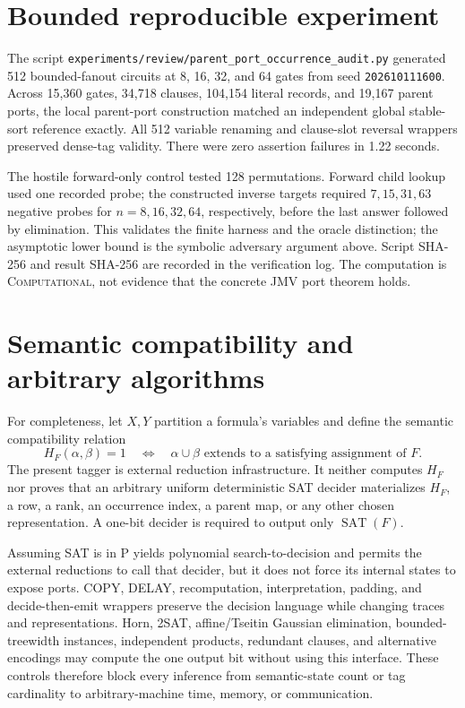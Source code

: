 \documentclass[11pt]{article}
\newcommand{\status}[1]{\textsc{#1}}
\begin{document}
\section{Bounded reproducible experiment}

The script
\texttt{experiments/review/parent\_port\_occurrence\_audit.py} generated 512
bounded-fanout circuits at 8, 16, 32, and 64 gates from seed
\texttt{202610111600}.  Across 15,360 gates, 34,718 clauses, 104,154 literal
records, and 19,167 parent ports, the local parent-port construction matched
an independent global stable-sort reference exactly.  All 512 variable
renaming and clause-slot reversal wrappers preserved dense-tag validity.
There were zero assertion failures in 1.22 seconds.

The hostile forward-only control tested 128 permutations.  Forward child
lookup used one recorded probe; the constructed inverse targets required
$7,15,31,63$ negative probes for $n=8,16,32,64$, respectively, before the
last answer followed by elimination.  This validates the finite harness and
the oracle distinction; the asymptotic lower bound is the symbolic adversary
argument above.  Script SHA-256 and result SHA-256 are recorded in the
verification log.  The computation is \status{Computational}, not evidence
that the concrete JMV port theorem holds.

\section{Semantic compatibility and arbitrary algorithms}

For completeness, let $X,Y$ partition a formula's variables and define the
semantic compatibility relation
\[
 H_F(\alpha,\beta)=1
 \quad\Longleftrightarrow\quad
 \alpha\cup\beta\text{ extends to a satisfying assignment of }F.
\]
The present tagger is external reduction infrastructure.  It neither
computes $H_F$ nor proves that an arbitrary uniform deterministic SAT decider
materializes $H_F$, a row, a rank, an occurrence index, a parent map, or any
other chosen representation.  A one-bit decider is required to output only
$\operatorname{SAT}(F)$.

Assuming SAT is in P yields polynomial search-to-decision and permits the
external reductions to call that decider, but it does not force its internal
states to expose ports.  COPY, DELAY, recomputation, interpretation, padding,
and decide-then-emit wrappers preserve the decision language while changing
traces and representations.  Horn, 2SAT, affine/Tseitin Gaussian
elimination, bounded-treewidth instances, independent products, redundant
clauses, and alternative encodings may compute the one output bit without
using this interface.  These controls therefore block every inference from
semantic-state count or tag cardinality to arbitrary-machine time, memory,
or communication.
\end{document}

